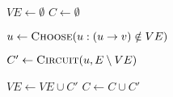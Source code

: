 
\begin{algorithm}[H]
  \begin{algorithmic}
    \State $VE \gets \emptyset$
    \State $C \gets \emptyset$

    \Statex
      \State $u \gets \Call{Choose}{u : (u \to v) \notin VE}$

      \hStatex
      \State $C' \gets \Call{Circuit}{u, E \setminus VE}$

      \hStatex
      \State $VE \gets VE \cup C'$
      \State $C \gets C \cup C'$
    \EndWhile
  \end{algorithmic}
\end{algorithm}
